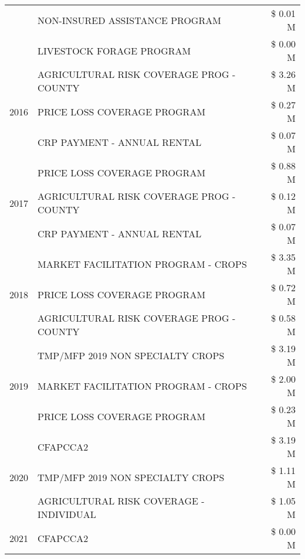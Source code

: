 \begin{tabular}{llr}
 & NON-INSURED ASSISTANCE PROGRAM & \$ 0.01 M \\
 & LIVESTOCK FORAGE PROGRAM & \$ 0.00 M \\
\cline{1-3}
\multirow[t]{3}{*}{2016} & AGRICULTURAL RISK COVERAGE PROG - COUNTY & \$ 3.26 M \\
 & PRICE LOSS COVERAGE PROGRAM & \$ 0.27 M \\
 & CRP PAYMENT - ANNUAL RENTAL & \$ 0.07 M \\
\cline{1-3}
\multirow[t]{3}{*}{2017} & PRICE LOSS COVERAGE PROGRAM & \$ 0.88 M \\
 & AGRICULTURAL RISK COVERAGE PROG - COUNTY & \$ 0.12 M \\
 & CRP PAYMENT - ANNUAL RENTAL & \$ 0.07 M \\
\cline{1-3}
\multirow[t]{3}{*}{2018} & MARKET FACILITATION PROGRAM - CROPS & \$ 3.35 M \\
 & PRICE LOSS COVERAGE PROGRAM & \$ 0.72 M \\
 & AGRICULTURAL RISK COVERAGE PROG - COUNTY & \$ 0.58 M \\
\cline{1-3}
\multirow[t]{3}{*}{2019} & TMP/MFP 2019 NON SPECIALTY CROPS & \$ 3.19 M \\
 & MARKET FACILITATION PROGRAM - CROPS & \$ 2.00 M \\
 & PRICE LOSS COVERAGE PROGRAM & \$ 0.23 M \\
\cline{1-3}
\multirow[t]{3}{*}{2020} & CFAPCCA2 & \$ 3.19 M \\
 & TMP/MFP 2019 NON SPECIALTY CROPS & \$ 1.11 M \\
 & AGRICULTURAL RISK COVERAGE - INDIVIDUAL & \$ 1.05 M \\
\cline{1-3}
2021 & CFAPCCA2 & \$ 0.00 M \\
\cline{1-3}
\bottomrule
\end{tabular}
